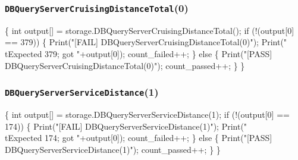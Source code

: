 \documentclass{article}
\def\nwendcode{\endtrivlist \endgroup}
\let\nwdocspar=\par
\theoremstyle{definition}
\begin{document}
\subsubsection{{\tt{}DBQueryServerCruisingDistanceTotal}(0)}
\nwenddocs{}\endmoddef{}
\{
  int output[] = storage.DBQueryServerCruisingDistanceTotal();
  if (!(output[0] == 379)) \{
    Print("[FAIL] DBQueryServerCruisingDistanceTotal(0)");
    Print("\\tExpected 379; got "+output[0]);
    count_failed++;
  \} else \{
    Print("[PASS] DBQueryServerCruisingDistanceTotal(0)");
    count_passed++;
  \}
\}
\nwendcode{}\nwdocspar
\subsubsection{{\tt{}DBQueryServerServiceDistance}(1)}
\nwenddocs{}\endmoddef{}
\{
  int output[] = storage.DBQueryServerServiceDistance(1);
  if (!(output[0] == 174)) \{
    Print("[FAIL] DBQueryServerServiceDistance(1)");
    Print("\\tExpected 174; got "+output[0]);
    count_failed++;
  \} else \{
    Print("[PASS] DBQueryServerServiceDistance(1)");
    count_passed++;
  \}
\}
\nwendcode{}\nwdocspar
\end{document}
